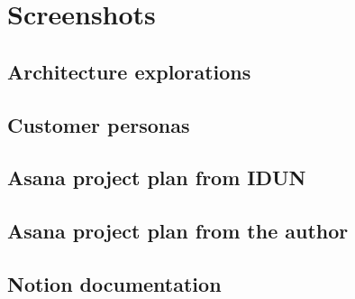 \chapter{Screenshots}
\label{appendix4-screenshots}

\section*{Architecture explorations}

\section*{Customer personas}

\section*{Asana project plan from IDUN}

\section*{Asana project plan from the author}

\section*{Notion documentation}
